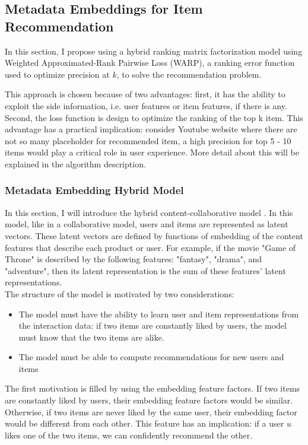 \subsection{Metadata Embeddings for Item Recommendation}
In this section, I propose using a hybrid ranking matrix factorization model using Weighted Approximated-Rank Pairwise Loss (WARP), a ranking error function used to optimize precision at \(k\), to solve the recommendation problem. 

This approach is chosen because of two advantages: first, it has the ability to exploit the side information, i.e. user features or item features, if there is any. Second, the loss function is design to optimize the ranking of the top k item. This advantage has a practical implication: consider Youtube website where there are not so many placeholder for recommended item, a high precision for top 5 - 10 items would play a critical role in user experience. More detail about this will be explained in the algorithm description.

\subsubsection{Metadata Embedding Hybrid Model}

In this section, I will introduce the hybrid content-collaborative model \cite{kula2015metadata}. In this model, like in a collaborative model, users and items are represented as latent vectors. These latent vectors are defined by functions of embedding of the content features that describe each product or user. For example, if the movie "Game of Throne" is described by the following features: "fantasy", "drama", and "adventure", then its latent representation is the sum of these features' latent representations.\\

\noindent The structure of the model is motivated by two considerations:

\begin{itemize}
	\item The model must have the ability to learn user and item representations from the interaction data: if two items are constantly liked by users, the model must know that the two items are alike.
	\item The model must be able to compute recommendations for new users and items
\end{itemize}

\noindent The first motivation is filled by using the embedding feature factors. If two items are constantly liked by users, their embedding feature factors would be similar. Otherwise, if two items are never liked by the same user, their embedding factor would be different from each other. This feature has an implication: if a user \(u\) likes one of the two items, we can confidently recommend the other.

